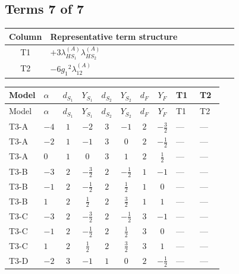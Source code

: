 \documentclass[8pt]{article}
\begin{document}
\begin{landscape}
\subsection*{Terms 7 of 7}
\begin{center}
\begin{tabular}{@{}c >{\raggedright\arraybackslash}p{0.82\linewidth}@{}}
\toprule
Column & Representative term structure \\
\midrule
T1 & \(\displaystyle +3 {\lambda_{HS_1}^{(A)}} {\lambda_{HS_2}^{(A)}}\) \\
\midrule
T2 & \(\displaystyle -6 {g_1}^2 {\lambda_{12}^{(A)}}\) \\
\midrule
\bottomrule
\end{tabular}
\end{center}
\smallskip
\tiny
\begin{longtable}{@{}llcccccc >{\raggedright\arraybackslash}p{0.21\linewidth} >{\raggedright\arraybackslash}p{0.21\linewidth}@{}}
\toprule
Model & $\alpha$ & $d_{S_1}$ & $Y_{S_1}$ & $d_{S_2}$ & $Y_{S_2}$ & $d_F$ & $Y_F$ & T1 & T2 \\
\midrule
\endfirsthead
\toprule
Model & $\alpha$ & $d_{S_1}$ & $Y_{S_1}$ & $d_{S_2}$ & $Y_{S_2}$ & $d_F$ & $Y_F$ & T1 & T2 \\
\midrule
\endhead
T3-A & $-4$ & $1$ & $-2$ & $3$ & $-1$ & $2$ & $-\frac{3}{2}$ & --- & --- \\
\midrule
T3-A & $-2$ & $1$ & $-1$ & $3$ & $0$ & $2$ & $-\frac{1}{2}$ & --- & --- \\
\midrule
T3-A & $0$ & $1$ & $0$ & $3$ & $1$ & $2$ & $\frac{1}{2}$ & --- & --- \\
\midrule
T3-B & $-3$ & $2$ & $-\frac{3}{2}$ & $2$ & $-\frac{1}{2}$ & $1$ & $-1$ & --- & --- \\
\midrule
T3-B & $-1$ & $2$ & $-\frac{1}{2}$ & $2$ & $\frac{1}{2}$ & $1$ & $0$ & --- & --- \\
\midrule
T3-B & $1$ & $2$ & $\frac{1}{2}$ & $2$ & $\frac{3}{2}$ & $1$ & $1$ & --- & --- \\
\midrule
T3-C & $-3$ & $2$ & $-\frac{3}{2}$ & $2$ & $-\frac{1}{2}$ & $3$ & $-1$ & --- & --- \\
\midrule
T3-C & $-1$ & $2$ & $-\frac{1}{2}$ & $2$ & $\frac{1}{2}$ & $3$ & $0$ & --- & --- \\
\midrule
T3-C & $1$ & $2$ & $\frac{1}{2}$ & $2$ & $\frac{3}{2}$ & $3$ & $1$ & --- & --- \\
\midrule
T3-D & $-2$ & $3$ & $-1$ & $1$ & $0$ & $2$ & $-\frac{1}{2}$ & --- & --- \\

\end{longtable}
\end{landscape}
\end{document}
